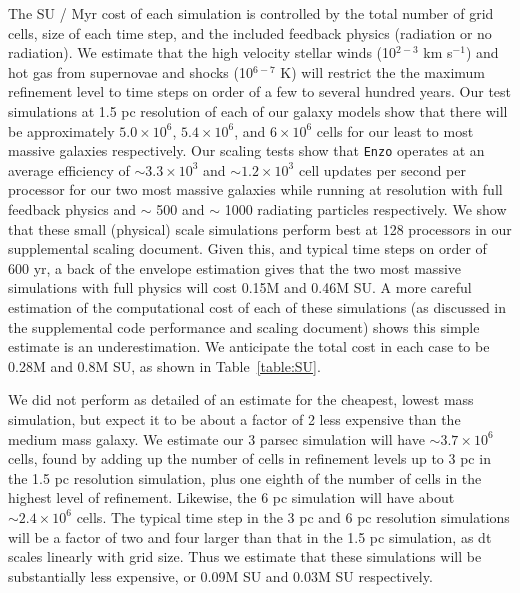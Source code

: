 \documentclass[11pt]{article}
\begin{document}
The SU / Myr cost of each simulation is controlled by the total number of grid cells, size of each time step, and the included feedback physics (radiation or no radiation). We estimate that the high velocity stellar winds (10$^{2-3}$ km s$^{-1}$) and hot gas from supernovae and shocks (10$^{6-7}$ K) will restrict the the maximum refinement level to time steps on order of a few to several hundred years. Our test simulations at 1.5 pc resolution of each of our galaxy models show that there will be approximately $5.0 \times 10^{6}$, $5.4 \times 10^{6}$, and $6 \times 10^{6}$ cells for our least to most massive galaxies respectively. Our scaling tests show that \texttt{Enzo} operates at an average efficiency of $\sim 3.3\times 10^{3}$ and $\sim 1.2\times 10^{3}$ cell updates per second per processor for our two most massive galaxies while running at resolution with full feedback physics and $\sim$ 500 and $\sim$ 1000 radiating particles respectively. We show that these small (physical) scale simulations perform best at 128 processors in our supplemental scaling document. Given this, and typical time steps on order of 600 yr, a back of the envelope estimation gives that the two most massive simulations with full physics will cost 0.15M and 0.46M SU. A more careful estimation of the computational cost of each of these simulations (as discussed in the supplemental code performance and scaling document) shows this simple estimate is an underestimation. We anticipate the total cost in each case to be 0.28M and 0.8M SU, as shown in Table~\ref{table:SU}.

We did not perform as detailed of an estimate for the cheapest, lowest mass simulation, but expect it to be about a factor of 2 less expensive than the medium mass galaxy. We estimate our 3 parsec simulation will have $\sim 3.7 \times 10^{6}$ cells, found by adding up the number of cells in refinement levels up to 3 pc in the 1.5 pc resolution simulation, plus one eighth of the number of cells in the highest level of refinement. Likewise, the 6 pc simulation will have about $\sim 2.4 \times 10^{6}$ cells. The typical time step in the 3 pc and 6 pc resolution simulations will be a factor of two and four larger than that in the 1.5 pc simulation, as dt scales linearly with grid size. Thus we estimate that these simulations will be substantially less expensive, or 0.09M SU and 0.03M SU respectively.
\end{document}
